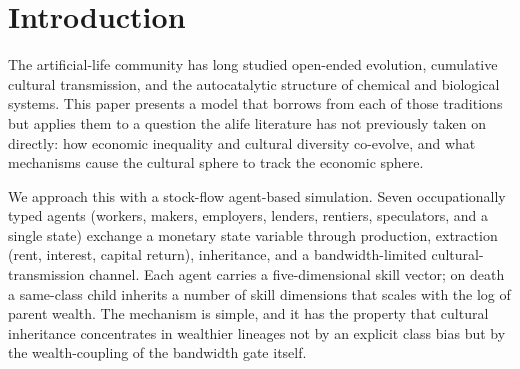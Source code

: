 \documentclass[11pt]{article}
\begin{document}
\begin{abstract}
We note in passing a result from the policy-comparison side of the
broader project: an absolute cap on inheritance raises the wealth
share held by the bottom 50\% of the population from 0.0\% under
status quo to 19.2\% (cap alone) or 25.3\% (cap plus 2\% wealth
tax).  The same intervention raises the productive-flow share
$\Phi$ from approximately zero to 0.27--0.37.  Among the
instruments we tested, the cap is the only one that changes both
the ownership distribution and the productive--extractive flow
balance materially.  The cultural-economic asymmetry result of
this paper provides part of the mechanistic explanation: the
extractive classes have weak skill-to-wealth feedback, so
redistributing skills does not redistribute wealth, but
redistributing the inheritance of wealth itself does.  The
policy-discourse implications of the cap result are reported in
the companion submission targeting Fiscal Studies.

We position these cultural contributions relative to the
cultural-evolution and
open-ended-evolution literatures, locate the model relative to
\citet{spangler2022distribution} as the closest published economic-ABM
neighbour, and discuss the limits of the cultural model and the
open-skills extension. The fiscal-policy results that follow naturally
from the model are summarised in a companion submission targeting
the heterodox-economics literature.
\end{abstract}

\section{Introduction}

The artificial-life community has long studied open-ended evolution,
cumulative cultural transmission, and the autocatalytic structure of
chemical and biological systems. This paper presents a model that
borrows from each of those traditions but applies them to a question
the alife literature has not previously taken on directly: how
economic inequality and cultural diversity co-evolve, and what
mechanisms cause the cultural sphere to track the economic sphere.

We approach this with a stock-flow agent-based simulation. Seven
occupationally typed agents (workers, makers, employers, lenders,
rentiers, speculators, and a single state) exchange a monetary state
variable through production, extraction (rent, interest, capital
return), inheritance, and a bandwidth-limited cultural-transmission
channel. Each agent carries a five-dimensional skill vector; on death
a same-class child inherits a number of skill dimensions that scales
with the log of parent wealth. The mechanism is simple, and it has the
property that cultural inheritance concentrates in wealthier lineages
not by an explicit class bias but by the wealth-coupling of the
bandwidth gate itself.
\end{document}
